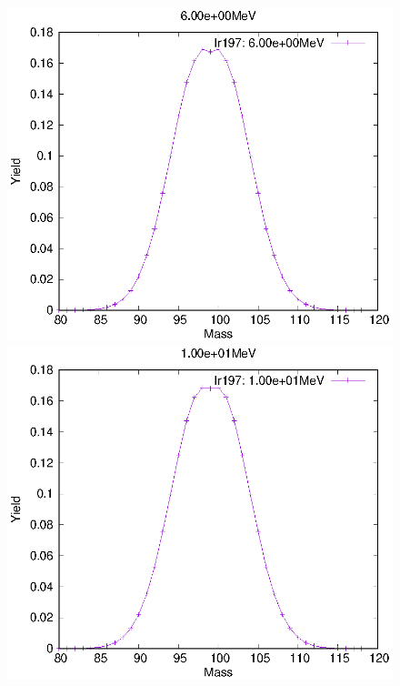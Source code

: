 \begin{figure}[htbp]
 \begin{minipage}{0.33\textwidth} \begin{center} \includegraphics[width=\textwidth]{YA/Ir197_6.00e+00.eps} \end{center} \end{minipage}
\begin{minipage}{0.33\textwidth} \begin{center} \includegraphics[width=\textwidth]{YA/Ir197_1.00e+01.eps} \end{center} \end{minipage}

\end{figure}
